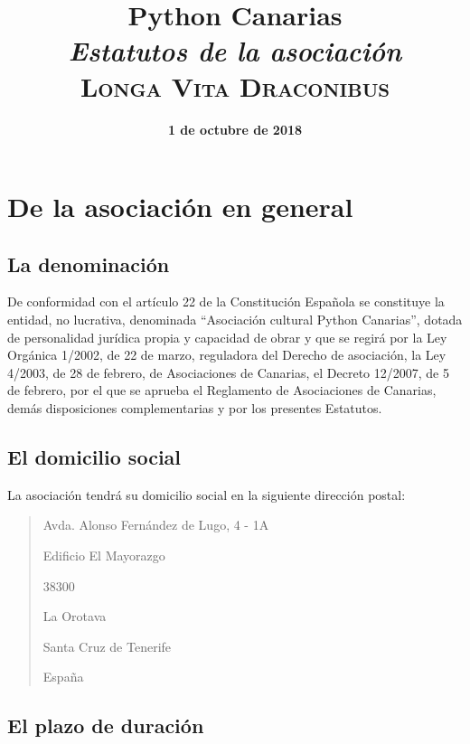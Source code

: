 \documentclass[a4paper, 12pt, oneside]{book}
\title{
    \huge \textbf{Python Canarias} \\
    \textit{Estatutos de la asociación} \\
    \vspace{1cm}
    \large \textsc{Longa Vita Draconibus}
}
\date{\textbf{1 de octubre de 2018}}
\author{}
\begin{document}
\maketitle

\tableofcontents

\chapter{De la asociación en general}

\section{La denominación}

De conformidad con el artículo 22 de la Constitución Española se constituye la entidad, no lucrativa, denominada ``Asociación cultural Python Canarias'', dotada de personalidad jurídica propia y capacidad de obrar y que se regirá por la Ley Orgánica 1/2002, de 22 de marzo, reguladora del Derecho de asociación, la Ley 4/2003, de 28 de febrero, de Asociaciones de Canarias, el Decreto 12/2007, de 5 de febrero, por el que se aprueba el Reglamento de Asociaciones de Canarias, demás disposiciones complementarias y por los presentes Estatutos.

\section{El domicilio social}

La asociación tendrá su domicilio social en la siguiente dirección postal:

\begin{quotation}

    Avda. Alonso Fernández de Lugo, 4 - 1A

    Edificio El Mayorazgo

    38300

    La Orotava

    Santa Cruz de Tenerife

    España





\end{quotation}

\section{El plazo de duración}
\end{document}
